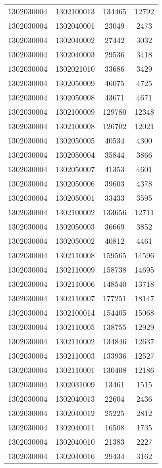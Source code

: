 \begin{longtable}{llcc}
1302030004 & 1302100013 & 134465 & 12792\\
1302030004 & 1302040001 & 23049 & 2473\\
1302030004 & 1302040002 & 27442 & 3032\\
1302030004 & 1302040003 & 29536 & 3418\\
1302030004 & 1302021010 & 33686 & 3429\\
1302030004 & 1302050009 & 46075 & 4725\\
1302030004 & 1302050008 & 43671 & 4671\\
1302030004 & 1302100009 & 129780 & 12348\\
1302030004 & 1302100008 & 126702 & 12021\\
1302030004 & 1302050005 & 40534 & 4300\\
1302030004 & 1302050004 & 35844 & 3866\\
1302030004 & 1302050007 & 41353 & 4601\\
1302030004 & 1302050006 & 39603 & 4378\\
1302030004 & 1302050001 & 33433 & 3595\\
1302030004 & 1302100002 & 133656 & 12711\\
1302030004 & 1302050003 & 36669 & 3852\\
1302030004 & 1302050002 & 40812 & 4461\\
1302030004 & 1302110008 & 159565 & 14596\\
1302030004 & 1302110009 & 158738 & 14695\\
1302030004 & 1302110006 & 148540 & 13718\\
1302030004 & 1302110007 & 177251 & 18147\\
1302030004 & 1302100014 & 154405 & 15068\\
1302030004 & 1302110005 & 138755 & 12929\\
1302030004 & 1302110002 & 134846 & 12637\\
1302030004 & 1302110003 & 133936 & 12527\\
1302030004 & 1302110001 & 130408 & 12186\\
1302030004 & 1302031009 & 13461 & 1515\\
1302030004 & 1302040013 & 22604 & 2436\\
1302030004 & 1302040012 & 25225 & 2812\\
1302030004 & 1302040011 & 16508 & 1735\\
1302030004 & 1302040010 & 21383 & 2227\\
1302030004 & 1302040016 & 29434 & 3162\\

\end{longtable}
